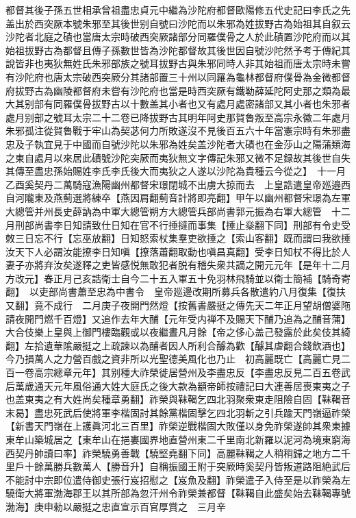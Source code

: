 都督其後子孫五世相承曾祖盡忠貞元中繼為沙陀府都督歐陽修五代史記曰李氏之先盖出於西突厥本號朱邪至其後世别自號曰沙陀而以朱邪為姓拔野古為始祖其自叙云沙陀者北庭之磧也當唐太宗時破西突厥諸部分同羅僕骨之人於此磧置沙陀府而以其始祖拔野古為都督且傳子孫數世皆為沙陀都督故其後世因自號沙陀然予考于傳紀其說皆非也夷狄無姓氏朱邪部族之號耳拔野古與朱邪同時人非其始祖而唐太宗時未嘗有沙陀府也唐太宗破西突厥分其諸部置三十州以同羅為龜林都督府僕骨為金微都督府拔野古為幽陵都督府未嘗有沙陀府也當是時西突厥有鐵勒薛延陀阿史那之類為最大其别部有同羅僕骨拔野古以十數盖其小者也又有處月處密諸部又其小者也朱邪者處月别部之號耳太宗二十二卷已降拔野古其明年阿史那賀魯叛至高宗永徽二年處月朱邪孤注從賀魯戰于牢山為契苾何力所敗遂沒不見後百五六十年當憲宗時有朱邪盡忠及子執宜見于中國而自號沙陀以朱邪為姓矣盖沙陀者大磧也在金莎山之陽蒲類海之東自處月以來居此磧號沙陀突厥而夷狄無文字傳記朱邪又微不足録故其後世自失其傳至盡忠孫始賜姓李氏李氏後大而夷狄之人遂以沙陀為貴種云今從之】　十一月乙酉奚契丹二萬騎寇漁陽幽州都督宋璟閉城不出虜大掠而去　上皇誥遣皇帝廵邉西自河隴東及燕薊選將練卒【燕因肩翻薊音計將即亮翻】甲午以幽州都督宋璟為左軍大總管并州長史薛訥為中軍大總管朔方大總管兵部尚書郭元振為右軍大總管　十二月刑部尚書李日知請致仕日知在官不行捶撻而事集【捶止橤翻下同】刑部有令史受敇三日忘不行【忘巫放翻】日知怒索杖集羣吏欲捶之【索山客翻】既而謂曰我欲捶汝天下人必謂汝能撩李日知嗔【撩落蕭翻取動也嗔昌真翻】受李日知杖不得比於人妻子亦將弃汝矣遂釋之吏皆感悦無敢犯者脱有稽失衆共謫之開元元年【是年十二月方改元】春正月己亥誥衛士自今二十五入軍五十免羽林飛騎並以衛士簡補【騎奇寄翻】　以吏部尚書蕭至忠為中書令　皇帝廵邊改期所募兵各散遣約八月復集【復扶又翻】竟不成行　二月庚子夜開門然燈【按舊書嚴挺之傳先天二年正月望胡僧婆陁請夜開門燃千百燈】又追作去年大酺【元年受内禅不及賜天下酺乃追為之酺音蒲】大合伎樂上皇與上御門樓臨觀或以夜繼晝凡月餘【帝之侈心盖己發露於此矣伎其綺翻】左拾遺華隂嚴挺之上疏諫以為酺者因人所利合醵為歡【醵其虐翻合錢飲酒也】今乃損萬人之力營百戲之資非所以光聖德美風化也乃止　初高麗既亡【高麗亡見二百一卷高宗總章元年】其别種大祚榮徙居營州及李盡忠反【李盡忠反見二百五卷武后萬歲通天元年風俗通大姓大庭氏之後大款為顓帝師按禮記曰大連善居喪東夷之子也盖東夷之有大姓尚矣種章勇翻】祚榮與靺鞨乞四北羽聚衆東走阻險自固【靺鞨音末曷】盡忠死武后使將軍李楷固討其餘黨楷固擊乞四北羽斬之引兵踰天門嶺逼祚榮【新書天門嶺在上護眞河北三百里】祚榮逆戰楷固大敗僅以身免祚榮遂帥其衆東據東牟山築城居之【東牟山在挹婁國界地直營州東二千里南北新羅以泥河為境東窮海西契丹帥讀曰率】祚榮驍勇善戰【驍堅堯翻下同】高麗靺鞨之人稍稍歸之地方二千里戶十餘萬勝兵數萬人【勝音升】自稱振國王附于突厥時奚契丹皆叛道路阻絶武后不能討中宗即位遣侍御史張行岌招慰之【岌魚及翻】祚榮遣子入侍至是以祚榮為左驍衛大將軍渤海郡王以其所部為忽汗州令祚榮兼都督【靺鞨自此盛矣始去靺鞨專號渤海】庚申勑以嚴挺之忠直宣示百官厚賞之　三月辛


